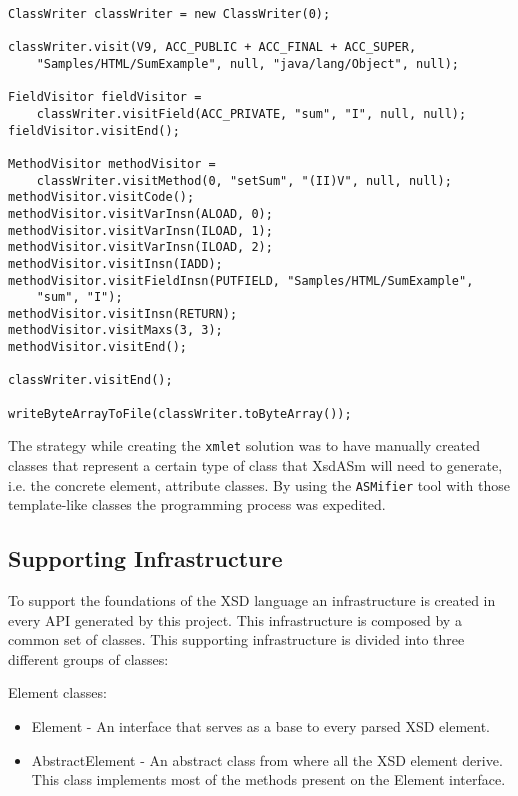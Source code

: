 \begin{minipage}{\linewidth}
\begin{lstlisting}[caption={ASM Example - Required Code},captionpos=b,label={lst:asmexamplecode}]
ClassWriter classWriter = new ClassWriter(0);

classWriter.visit(V9, ACC_PUBLIC + ACC_FINAL + ACC_SUPER, 
	"Samples/HTML/SumExample", null, "java/lang/Object", null);

FieldVisitor fieldVisitor = 
	classWriter.visitField(ACC_PRIVATE, "sum", "I", null, null);
fieldVisitor.visitEnd();

MethodVisitor methodVisitor = 
	classWriter.visitMethod(0, "setSum", "(II)V", null, null);
methodVisitor.visitCode();
methodVisitor.visitVarInsn(ALOAD, 0);
methodVisitor.visitVarInsn(ILOAD, 1);
methodVisitor.visitVarInsn(ILOAD, 2);
methodVisitor.visitInsn(IADD);
methodVisitor.visitFieldInsn(PUTFIELD, "Samples/HTML/SumExample",
	"sum", "I");
methodVisitor.visitInsn(RETURN);
methodVisitor.visitMaxs(3, 3);
methodVisitor.visitEnd();

classWriter.visitEnd();

writeByteArrayToFile(classWriter.toByteArray());
\end{lstlisting}
\end{minipage}

\noindent
The strategy while creating the \texttt{xmlet} solution was to have manually created classes that represent a certain type of class that XsdASm will need to generate, i.e. the concrete element, attribute classes. By using the \texttt{ASMifier} tool with those template-like classes the programming process was expedited.

\subsection{Supporting Infrastructure}
\label{sec:supportinginfrastructure}

To support the foundations of the \ac{XSD} language an infrastructure is created in every \ac{API} generated by this project. This infrastructure is composed by a common set of classes. This supporting infrastructure is divided into three different groups of classes:

Element classes:

\begin{itemize}  
	\item Element - An interface that serves as a base to every parsed \ac{XSD} element.
	\item AbstractElement - An abstract class from where all the \ac{XSD} element derive. This class implements most of the methods present on the Element interface.
\end{itemize}

